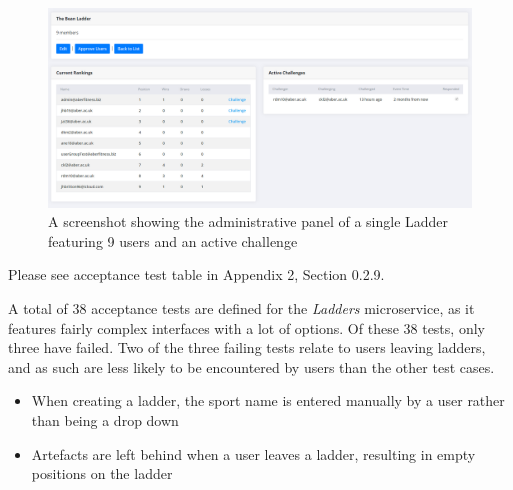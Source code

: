 \begin{figure}[H]
    \centering
    \includegraphics[width=\textwidth]{Images/service_ladders.png}
    \caption{A screenshot showing the administrative panel of a single Ladder featuring 9 users and an active challenge}
\end{figure}

Please see acceptance test table in Appendix 2, Section 0.2.9.

A total of 38 acceptance tests are defined for the \textit{Ladders} microservice, as it features fairly complex interfaces with a lot of options. Of these 38 tests, only three have failed. Two of the three failing tests relate to users leaving ladders, and as such are less likely to be encountered by users than the other test cases.


\begin{itemize}
	\item When creating a ladder, the sport name is entered manually by a user rather than being a drop down

	\item Artefacts are left behind when a user leaves a ladder, resulting in empty positions on the ladder
\end{itemize}